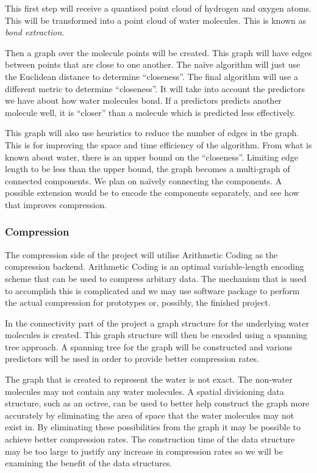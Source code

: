 \documentclass[a4paper,twocolumn]{article}
\begin{document}
This first step will receive a quantised point cloud of hydrogen and oxygen
atoms. This will be transformed into a point cloud of water molecules. This is
known as \emph{bond extraction}.

Then a graph over the molecule points will be created. This graph will have
edges between points that are close to one another. The na\"ive algorithm will
just use the Euclidean distance to determine ``closeness''. The final
algorithm will use a different metric to determine ``closeness''. It will take
into account the predictors we have about how water molecules bond. If a
predictors predicts another molecule well, it is ``closer'' than a molecule
which is predicted less effectively.

This graph will also use heuristics to reduce the number of edges in the
graph. This is for improving the space and time efficiency of the
algorithm. From what is known about water, there is an upper bound on the
``closeness''. Limiting edge length to be less than the upper bound, the graph
becomes a multi-graph of connected components. We plan on na\"ively connecting
the components. A possible extension would be to encode the components
separately, and see how that improves compression.


\subsubsection*{Compression}


The compression side of the project will utilise Arithmetic Coding as the
compression backend. Arithmetic Coding is an optimal variable-length encoding
scheme that can be used to compress arbitary data. The mechanism that is used
to accomplish this is complicated and we may use software package to perform
the actual compression for prototypes or, possibly, the finished project.

In the connectivity part of the project a graph structure for the
underlying water molecules is created. This graph structure will then
be encoded using a spanning tree approach. A spanning tree for the graph will
be constructed and various predictors will be used in order to provide better
compression rates.

The graph that is created to represent the water is not exact. The non-water
molecules may not contain any water molecules. A spatial divisioning data
structure, such as an octree, can be used to better help construct the graph
more accurately by eliminating the area of space that the water molecules may
not exist in. By eliminating these possibilities from the graph it may be
possible to achieve better compression rates. The construction time of the
data structure may be too large to justify any increase in compression rates
so we will be examining the benefit of the data structures.
\end{document}
